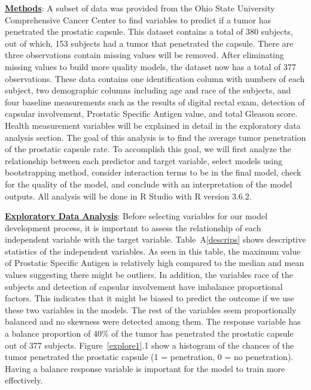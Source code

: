 \documentclass[11pt]{article}\usepackage[]{graphicx}\usepackage[]{color}
\begin{document}
\noindent\textbf{\underline{Methods}}: A subset of data was provided from the Ohio State University Comprehensive Cancer Center to find variables to predict if a tumor has penetrated the prostatic capsule. This dataset contains a total of 380 subjects, out of which, 153 subjects had a tumor that penetrated the capsule. There are three observations contain missing values will be removed. After eliminating missing values to build more quality models, the dataset now has a total of 377 observations. These data contains one identification column with numbers of each subject, two demographic columns including age and race of the subjects, and four baseline measurements such as the results of digital rectal exam, detection of capsular involvement, Prostatic Specific Antigen value, and total Gleason score. Health measurement variables will be explained in detail in the exploratory data analysis section. The goal of this analysis is to find the average tumor penetration of the prostatic capsule rate. To accomplish this goal, we will first analyze the relationship between each predictor and target variable, select models using bootstrapping method, consider interaction terms to be in the final model, check for the quality of the model, and conclude with an interpretation of the model outputs. All analysis will be done in R Studio with R version 3.6.2.       
\hfill \break

\noindent\textbf{\underline{Exploratory Data Analysis}}: Before selecting variables for our model development process, it is important to assess the relationship of each independent variable with the target variable. Table~A\ref{descrips} shows descriptive statistics of the independent variables. As seen in this table, the maximum value of Prostatic Specific Antigen is relatively high compared to the median and mean values suggesting there might be outliers. In addition, the variables race of the subjects and detection of capsular involvement have imbalance proportional factors. This indicates that it might be biased to predict the outcome if we use these two variables in the models. The rest of the variables seem proportionally balanced and no skewness were detected among them. The response variable has a balance proportion of 40\% of the tumor has penetrated the prostatic capsule out of 377 subjects. Figure~\ref{explore1}.1 show a histogram of the chances of the tumor penetrated the prostatic capsule (1 = penetration, 0 = no penetration). Having a balance response variable is important for the model to train more effectively.  
\end{document}
